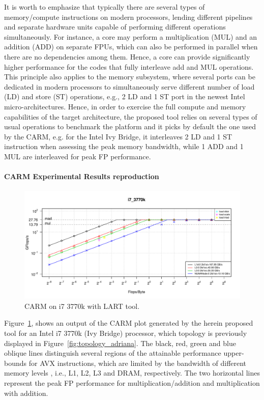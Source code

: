 \documentclass[twoside,twocolumn,8pt]{extarticle}
\begin{document}
It is worth to emphasize that typically there are several types of memory/compute instructions on modern processors, lending
different pipelines and separate hardware units capable of performing different operations simultaneously. For instance, a core
may perform a multiplication (MUL) and an addition (ADD) on separate FPUs, which  can also be performed in parallel when there are
no  dependencies among them. Hence, a core can provide significantly higher  performance for the codes that fully interleave add
and MUL operations. This principle also applies to the memory subsystem, where several ports can be dedicated in modern processors
to simultaneously serve different number of load (LD) and store (ST) operations, e.g., 2 LD and 1 ST port in the newest Intel
micro-architectures. Hence, in order to exercise the full  compute and memory capabilities of the target architecture, the proposed
tool   relies on several types of usual operations to benchmark the platform and it picks by default the one used by the CARM, e.g.
for the Intel Ivy Bridge, it interleaves 2 LD and 1 ST instruction  when assessing the peak memory bandwidth, while 1 ADD and 1 MUL
are interleaved for peak FP performance. 

\paragraph*{CARM Experimental Results reproduction}
\begin{figure}
  \includegraphics[width=\textwidth]{pictures/roofline_model}
  \caption{CARM on i7 3770k with LART tool.}
  \label{fig:LART_adriana}
\end{figure}

Figure~\ref{fig:LART_adriana}, shows an output of the CARM plot generated by the herein proposed tool for an Intel i7
3770k (Ivy Bridge) processor, which topology is previously displayed in Figure~\ref{fig:topology_adriana}.
The black, red, green and blue oblique lines distinguish several regions of the attainable performance upper-bounds for AVX
instructions, which are limited by the bandwidth of different memory levels , i.e., L1, L2, L3 and DRAM, respectively.
The two horizontal lines represent the peak FP performance for multiplication/addition and multiplication with addition. 
\end{document}
